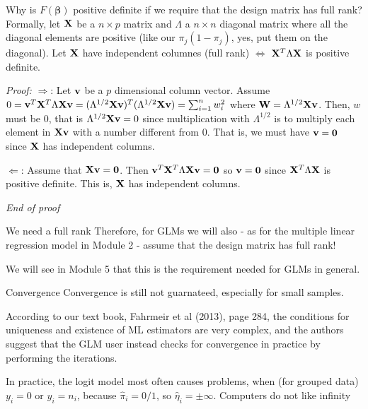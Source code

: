 \documentclass[
  ignorenonframetext,
]{beamer}
\begin{document}
\begin{frame}
\begin{block}{Why is \(F(\boldsymbol{\beta})\) positive definite if we
require that the design matrix has full rank?}
\label{why-is-fboldsymbolbeta-positive-definite-if-we-require-that-the-design-matrix-has-full-rank}
Formally, let \({\bf X}\) be a \(n\times p\) matrix and \(\Lambda\) a
\(n\times n\) diagonal matrix where all the diagonal elements are
positive (like our \(\pi_j(1-\pi_j)\), yes, put them on the diagonal).
Let \({\bf X}\) have independent columnes (full rank)
\(\Leftrightarrow\) \({\bf X}^T\Lambda{\bf X}\) is positive definite.

\emph{Proof:} \(\Rightarrow\): Let \({\bf v}\) be a \(p\) dimensional
column vector. Assume
\(0={\bf v}^T {\bf X}^T \Lambda {\bf X} {\bf v}=(\Lambda^{1/2}{\bf X}{\bf v})^T(\Lambda^{1/2}{\bf X}{\bf v})=\sum_{i=1}^n w_i^2\)
where \({\bf W}=\Lambda^{1/2}{\bf X}{\bf v}\). Then, \(w\) must be 0,
that is \(\Lambda^{1/2}{\bf X}{\bf v}=0\) since multiplication with
\(\Lambda^{1/2}\) is to multiply each element in \({\bf X}{\bf v}\) with
a number different from 0. That is, we must have \({\bf v}={\bf 0}\)
since \({\bf X}\) has independent columns.

\(\Leftarrow\): Assume that \({\bf X}{\bf v}={\bf 0}\). Then
\({\bf v}^T {\bf X}^T \Lambda {\bf X} {\bf v}={\bf 0}\) so
\({\bf v}={\bf 0}\) since \({\bf X}^T\Lambda{\bf X}\) is positive
definite. This is, \({\bf X}\) has independent columns.

\emph{End of proof}
\end{block}
\end{frame}

\begin{frame}
\begin{block}{We need a full rank}
\label{we-need-a-full-rank}
Therefore, for GLMs we will also - as for the multiple linear regression
model in Module 2 - assume that the design matrix has full rank!

We will see in Module 5 that this is the requirement needed for GLMs in
general.
\end{block}
\end{frame}

\begin{frame}
\begin{block}{Convergence}
\label{convergence}
Convergence is still not guarnateed, especially for small samples.

According to our text book, Fahrmeir et al (2013), page 284, the
conditions for uniqueness and existence of ML estimators are very
complex, and the authors suggest that the GLM user instead checks for
convergence in practice by performing the iterations.

In practice, the logit model most often causes problems, when (for
grouped data) \(y_i=0\) or \(y_i=n_i\), because \(\hat{\pi}_i=0/1\), so
\(\hat{\eta}_i=\pm \infty\). Computers do not like infinity
\end{block}
\end{frame}
\end{document}
